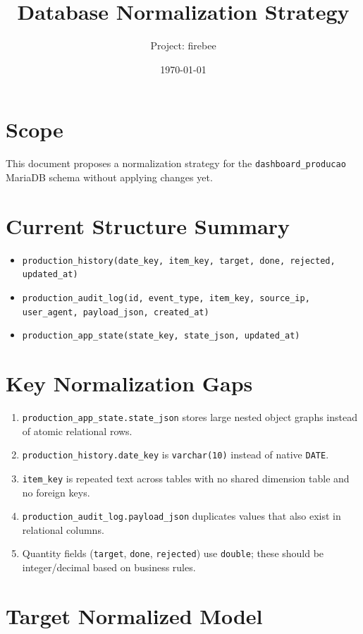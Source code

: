 \documentclass[11pt,a4paper]{article}
\title{Database Normalization Strategy}
\author{Project: firebee}
\date{\today}
\begin{document}
\maketitle

\section*{Scope}
This document proposes a normalization strategy for the \texttt{dashboard\_producao} MariaDB schema without applying changes yet.

\section*{Current Structure Summary}
\begin{itemize}
  \item \texttt{production\_history(date\_key, item\_key, target, done, rejected, updated\_at)}
  \item \texttt{production\_audit\_log(id, event\_type, item\_key, source\_ip, user\_agent, payload\_json, created\_at)}
  \item \texttt{production\_app\_state(state\_key, state\_json, updated\_at)}
\end{itemize}

\section*{Key Normalization Gaps}
\begin{enumerate}
  \item \texttt{production\_app\_state.state\_json} stores large nested object graphs instead of atomic relational rows.
  \item \texttt{production\_history.date\_key} is \texttt{varchar(10)} instead of native \texttt{DATE}.
  \item \texttt{item\_key} is repeated text across tables with no shared dimension table and no foreign keys.
  \item \texttt{production\_audit\_log.payload\_json} duplicates values that also exist in relational columns.
  \item Quantity fields (\texttt{target}, \texttt{done}, \texttt{rejected}) use \texttt{double}; these should be integer/decimal based on business rules.
\end{enumerate}

\section*{Target Normalized Model}
\end{document}

